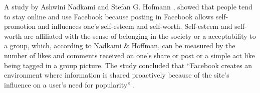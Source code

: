 A study by Ashwini Nadkami and Stefan G. Hofmann \citeyear{NadkarniHofmann2012}, showed that people tend to stay online and use Facebook because posting in Facebook allows self-promotion and influences one's self-esteem and self-worth. Self-esteem and self-worth are affiliated with the sense of belonging in the society or a acceptability to a group, which, according to Nadkami \& Hoffman, can be measured by the number of likes and comments received on one's share or post or a simple act like being tagged in a group picture. The study concluded that ``Facebook creates an environment where information is shared proactively because of the site's influence on a  user's need for popularity'' \cite{NadkarniHofmann2012}.